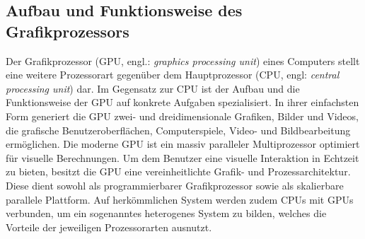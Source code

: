 \documentclass[crop=false]{standalone}
\begin{document}

    \subsection{Aufbau und Funktionsweise des Grafikprozessors} %
    \label{sub:aufbau_und_funktionsweise_des_grafikprozessors}
      Der Grafikprozessor (GPU, engl.: \textit{graphics processing unit}) eines Computers stellt eine weitere Prozessorart gegenüber dem Hauptprozessor (CPU, engl: \textit{central processing unit}) dar.
      Im Gegensatz zur CPU ist der Aufbau und die Funktionsweise der GPU auf konkrete Aufgaben spezialisiert.
      In ihrer einfachsten Form generiert die GPU zwei- und dreidimensionale Grafiken, Bilder und Videos, die grafische Benutzeroberflächen, Computerspiele, Video- und Bildbearbeitung ermöglichen.
      Die moderne GPU ist ein massiv paralleler Multiprozessor optimiert für visuelle Berechnungen.
      Um dem Benutzer eine visuelle Interaktion in Echtzeit zu bieten, besitzt die GPU eine vereinheitlichte Grafik- und Prozessarchitektur.
      Diese dient sowohl als programmierbarer Grafikprozessor sowie als skalierbare parallele Plattform.
      Auf herkömmlichen System werden zudem CPUs mit GPUs verbunden, um ein sogenanntes heterogenes System zu bilden, welches die Vorteile der jeweiligen Prozessorarten ausnutzt.
      \cite[S.~A3]{Patterson2011}

\end{document}
